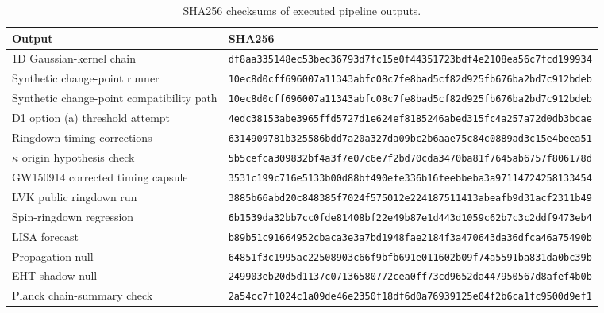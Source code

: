 ﻿\documentclass[12pt,a4paper]{article}
\theoremstyle{definition}
\begin{document}
\begin{table}[htbp]
\centering
\caption{SHA256 checksums of executed pipeline outputs.}
\label{tab:checksums}
\begin{tabular}{@{}p{4.8cm}p{9.7cm}@{}}
\toprule
Output & SHA256 \\
\midrule
1D Gaussian-kernel chain & \texttt{df8aa335148ec53bec36793d7fc15e0}\newline\texttt{f44351723bdf4e2108ea56c7fcd199934} \\
Synthetic change-point runner & \texttt{10ec8d0cff696007a11343abfc08c7fe}\newline\texttt{8bad5cf82d925fb676ba2bd7c912bdeb} \\
Synthetic change-point compatibility path & \texttt{10ec8d0cff696007a11343abfc08c7fe}\newline\texttt{8bad5cf82d925fb676ba2bd7c912bdeb} \\
D1 option (a) threshold attempt & \texttt{4edc38153abe3965ffd5727d1e624ef}\newline\texttt{8185246abed315fc4a257a72d0db3bcae} \\
Ringdown timing corrections & \texttt{6314909781b325586bdd7a20a327da09}\newline\texttt{bc2b6aae75c84c0889ad3c15e4beea51} \\
$\kappa$ origin hypothesis check & \texttt{5b5cefca309832bf4a3f7e07c6e7f2bd}\newline\texttt{70cda3470ba81f7645ab6757f806178d} \\
GW150914 corrected timing capsule & \texttt{3531c199c716e5133b00d88bf490efe}\newline\texttt{336b16feebbeba3a97114724258133454} \\
LVK public ringdown run & \texttt{3885b66abd20c848385f7024f575012}\newline\texttt{e224187511413abeafb9d31acf2311b49} \\
Spin-ringdown regression & \texttt{6b1539da32bb7cc0fde81408bf22e49b}\newline\texttt{87e1d443d1059c62b7c3c2ddf9473eb4} \\
LISA forecast & \texttt{b89b51c91664952cbaca3e3a7bd1948f}\newline\texttt{ae2184f3a470643da36dfca46a75490b} \\
Propagation null & \texttt{64851f3c1995ac22508903c66f9bfb69}\newline\texttt{1e011602b09f74a5591ba831da0bc39b} \\
EHT shadow null & \texttt{249903eb20d5d1137c07136580772cea}\newline\texttt{0ff73cd9652da447950567d8afef4b0b} \\
Planck chain-summary check & \texttt{2a54cc7f1024c1a09de46e2350f18d}\newline\texttt{f6d0a76939125e04f2b6ca1fc9500d9ef1} \\
\bottomrule
\end{tabular}
\end{table}
\end{document}
